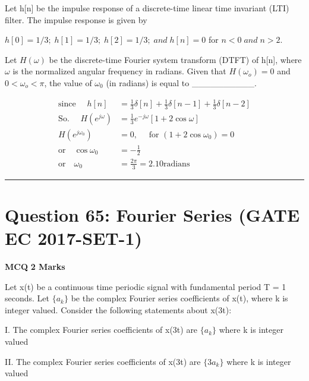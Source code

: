 \documentclass[11pt,a4paper]{article}
\begin{document}
\noindent Let h[n] be the impulse response of a discrete-time linear time invariant (LTI) filter. The impulse response is given by

$h[0]=1/3; \; h[1]=1/3; \; h[2]=1/3; \; and \; h[n]=0$ for $n < 0 \; and \; n > 2.$

 Let $H(\omega)$ be the discrete-time Fourier system transform (DTFT) of h[n], where $\omega$ is the normalized angular frequency in radians. Given that $H(\omega_{o})=0$ and $0 < \omega _{o} < \pi$, the value of $\omega_{0}$ (in radians) is equal to \_\_\_\_\_\_\_\_\_\_.


\begin{tcolorbox}[solbox, title=Detailed Solution -- Question 64]
\[
\begin{aligned} \text{since }\quad h[n]&=\frac{1}{3} \delta[n]+\frac{1}{3} \delta[n-1]+\frac{1}{3} \delta[n-2] \\ \text{So. }\quad H\left(e^{j \omega}\right)&=\frac{1}{3} e^{-j \omega}[1+2 \cos \omega] \\ H\left(e^{j \omega_{0}}\right)&=0, \quad\text{ for }\left(1+2 \cos \omega_{0}\right)=0 \\ \text{or} \quad \cos \omega_{0}&=-\frac{1}{2} \\ \text{or}\quad \omega_{0}&=\frac{2 \pi}{3}=2.10 \mathrm{radians} \end{aligned}
\]
\end{tcolorbox}

\vspace{1.5em}
\hrule
\vspace{1.5em}

\section*{Question 65: Fourier Series (GATE EC 2017-SET-1)}
\noindent \textbf{\color{primary}MCQ} \hfill \textbf{\color{secondary}2 Marks}


\noindent Let x(t) be a continuous time periodic signal with fundamental period T = 1 seconds. Let $\{a_{k}\}$ be the complex Fourier series coefficients of x(t), where k is integer valued. Consider the following statements about x(3t): 

I. The complex Fourier series coefficients of x(3t) are $\{a_{k}\}$ where k is integer valued  

II. The complex Fourier series coefficients of x(3t) are $\{3{a_{k}}\}$ where k is integer valued  
\end{document}
